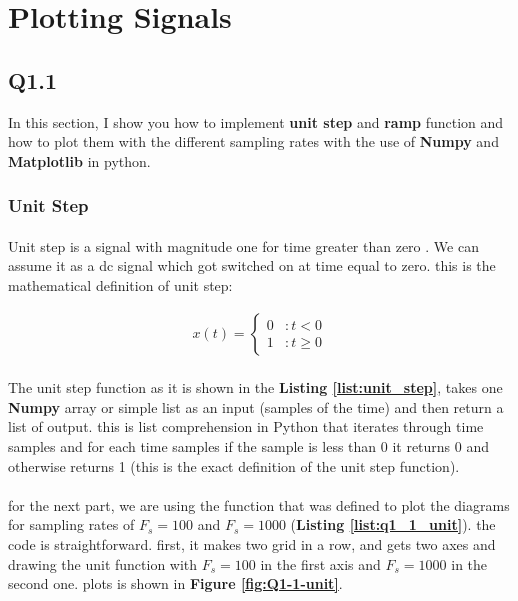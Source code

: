 \section{Plotting Signals}
\subsection{Q1.1}
In this section, I show you how to implement \textbf{unit step}
 and \textbf{ramp} function and how to plot them 
 with the different sampling rates with the use of 
 \textbf{Numpy} and \textbf{Matplotlib} in python.
\subsubsection{Unit Step}

\paragraph{} Unit step is a signal with magnitude one 
for time greater than zero . We can assume it as a dc 
signal which got switched on at time equal to zero.
this is the mathematical definition of unit step:

 \begin{align}
  x(t) = \begin{cases}
   0 &: t<0\\
   1 &: t\geq 0\end{cases}
 \end{align}

 \paragraph{}The unit step function as it is shown in the
  \textbf{Listing \ref{list:unit_step}}, takes one \textbf{Numpy} 
  array or simple list as an input (samples of the time) and then
  return a list of output. this is list comprehension in 
  Python that iterates through time samples and for each 
  time samples if the sample is less than 0 it returns 
  0 and otherwise returns 1 (this is the exact definition 
  of the unit step function). 


\paragraph{}for the next part, we are using the function that was defined to 
plot the diagrams for sampling rates of  $F_s=100$ and 
$F_s=1000$ (\textbf{Listing \ref{list:q1_1_unit}}). the code is 
straightforward. first, it makes two grid in a row, and gets 
two axes and drawing the unit function with $F_s=100$ in the 
first axis and $F_s=1000$ in the second one. plots is shown in \textbf{Figure \ref{fig:Q1-1-unit}}.

